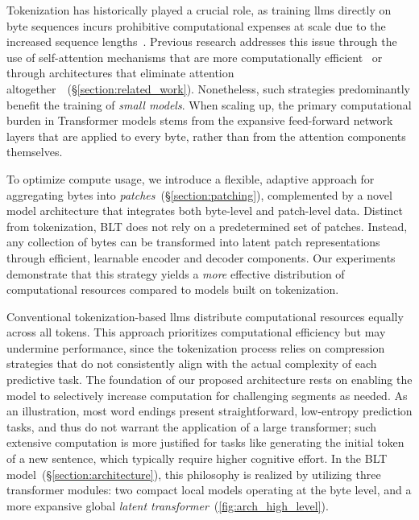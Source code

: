Tokenization has historically played a crucial role, as training llms directly on byte sequences incurs prohibitive computational expenses at scale due to the increased sequence lengths~\citep{xue2022byt5}. Previous research addresses this issue through the use of self-attention mechanisms that are more computationally efficient~\citep{el2020characterbert, clark2022canine} or through architectures that eliminate attention altogether~\citep{wang2024mambabyte}~(\S\ref{section:related_work}). Nonetheless, such strategies predominantly benefit the training of \textit{small models}. When scaling up, the primary computational burden in Transformer models stems from the expansive feed-forward network layers that are applied to every byte, rather than from the attention components themselves.

To optimize compute usage, we introduce a flexible, adaptive approach for aggregating bytes into \textit{patches}~(\S\ref{section:patching}), complemented by a novel model architecture that integrates both byte-level and patch-level data. Distinct from tokenization, {\textsc BLT} does not rely on a predetermined set of patches. Instead, any collection of bytes can be transformed into latent patch representations through efficient, learnable encoder and decoder components. Our experiments demonstrate that this strategy yields a \textit{more} effective distribution of computational resources compared to models built on tokenization.

Conventional tokenization-based llms distribute computational resources equally across all tokens. This approach prioritizes computational efficiency but may undermine performance, since the tokenization process relies on compression strategies that do not consistently align with the actual complexity of each predictive task. The foundation of our proposed architecture rests on enabling the model to selectively increase computation for challenging segments as needed. As an illustration, most word endings present straightforward, low-entropy prediction tasks, and thus do not warrant the application of a large transformer; such extensive computation is more justified for tasks like generating the initial token of a new sentence, which typically require higher cognitive effort. In the {\textsc BLT} model~(\S\ref{section:architecture}), this philosophy is realized by utilizing three transformer modules: two compact local models operating at the byte level, and a more expansive global \textit{latent transformer}~(\autoref{fig:arch_high_level}). 

